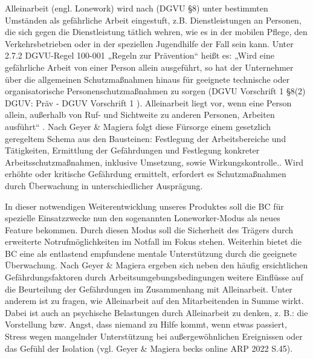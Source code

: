 \documentclass[thesis.tex]{subfiles}
\begin{document}
Alleinarbeit (engl. Lonework) wird nach (DGVU §8) \cite[§8]{Vorschrift1_DGUV} unter bestimmten Umständen als gefährliche Arbeit eingestuft, z.B. Dienstleistungen an Personen, die sich gegen die Dienstleistung tätlich wehren, wie es in der mobilen Pflege, den Verkehrsbetrieben oder in der speziellen Jugendhilfe der Fall sein kann.
Unter 2.7.2 DGVU-Regel 100-001 „Regeln zur Prävention“ heißt es: „Wird eine gefährliche Arbeit von einer Person allein ausgeführt, so hat der Unternehmer über die allgemeinen Schutzmaßnahmen hinaus für geeignete technische oder organisatorische Personenschutzmaßnahmen zu sorgen (DGVU Vorschrift 1 §8(2) DGUV: Präv - DGUV Vorschrift 1 ).
Alleinarbeit liegt vor, wenn eine Person allein, außerhalb von Ruf- und Sichtweite zu anderen Personen, Arbeiten ausführt“ \cite[S.42]{Regel_100-001}.
Nach Geyer \& Magiera folgt diese Fürsorge einem gesetzlich geregeltem Schema aus den Bausteinen: Festlegung der Arbeitsbereiche und Tätigkeiten, Ermittlung der Gefährdungen und Festlegung konkreter Arbeitsschutzmaßnahmen, inklusive Umsetzung, sowie Wirkungskontrolle.\cite[vgl. S.42 ff.]{GeyerMagiera2022}.
Wird erhöhte oder kritische Gefährdung ermittelt, erfordert es Schutzmaßnahmen durch Überwachung in unterschiedlicher Ausprägung.

In dieser notwendigen Weiterentwicklung unseres Produktes soll die BC für spezielle Einsatzzwecke nun den sogenannten Loneworker-Modus als neues Feature bekommen.
Durch diesen Modus soll die Sicherheit des Trägers durch erweiterte Notrufmöglichkeiten im Notfall im Fokus stehen.
Weiterhin bietet die BC eine als entlastend empfundene mentale Unterstützung durch die geeignete Überwachung.
Nach Geyer \& Magiera ergeben sich neben den häufig ersichtlichen Gefährdungsfaktoren durch Arbeitsumgebungsbedingungen weitere Einflüsse auf die Beurteilung der Gefährdungen im Zusammenhang mit Alleinarbeit.
Unter anderem ist zu fragen, wie Alleinarbeit auf den Mitarbeitenden in Summe wirkt.
Dabei ist auch an psychische Belastungen durch Alleinarbeit zu denken, z. B.: die Vorstellung bzw. Angst, dass niemand zu Hilfe kommt, wenn etwas passiert, Stress wegen mangelnder Unterstützung bei außergewöhnlichen Ereignissen oder das Gefühl der Isolation (vgl. Geyer \& Magiera becks online ARP 2022 S.45).
\end{document}
